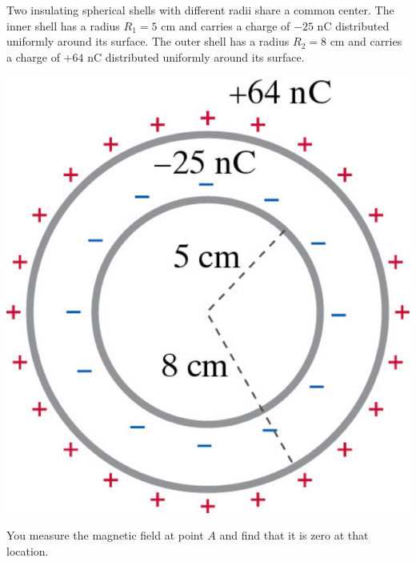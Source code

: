 \question[20] Two insulating spherical shells with different radii share a common center. The inner shell has a radius $R_1=5$ cm and carries a charge of $-25$ nC distributed uniformly around its surface. The outer shell has a radius $R_2=8$ cm and carries a charge of $+64$ nC distributed uniformly around its surface. 


\begin{center}
	\includegraphics[width=.4\textwidth]{concentric_shells.pdf}
\end{center}


You measure the magnetic field at point $A$ and find that it is zero at that location.

